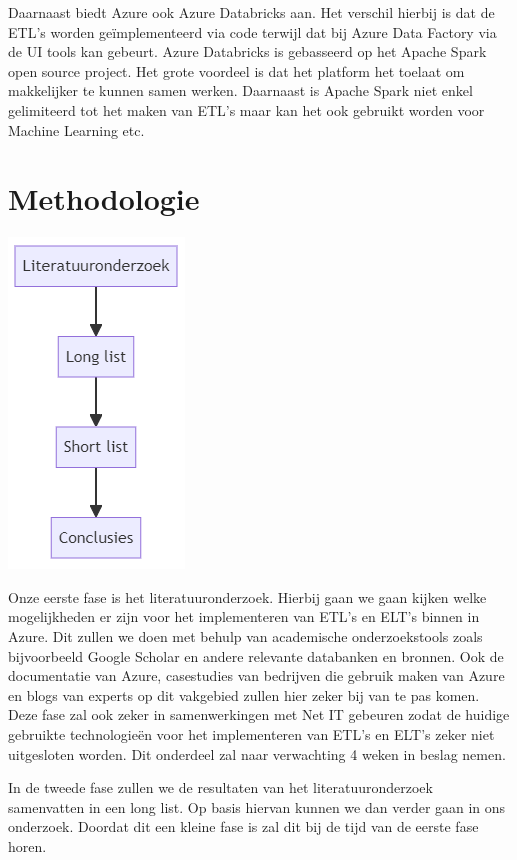 Daarnaast biedt Azure ook Azure Databricks aan. Het verschil hierbij is dat de ETL's worden geïmplementeerd via code terwijl dat bij Azure Data Factory via de UI tools kan gebeurt. Azure Databricks is gebasseerd op het Apache Spark open source project. Het grote voordeel is dat het platform het toelaat om makkelijker te kunnen samen werken. Daarnaast is Apache Spark niet enkel gelimiteerd tot het maken van ETL's maar kan het ook gebruikt worden voor Machine Learning etc.~\autocite{Etaati2019}

\section{Methodologie}%
\label{sec:methodologie}

\begin{center}
    \includegraphics{graphics/methodologie.png}    
\end{center}


Onze eerste fase is het literatuuronderzoek. Hierbij gaan we gaan kijken welke mogelijkheden er zijn voor het implementeren van ETL's en ELT's binnen in Azure. Dit zullen we doen met behulp van academische onderzoekstools zoals bijvoorbeeld Google Scholar en andere relevante databanken en bronnen. Ook de documentatie van Azure, casestudies van bedrijven die gebruik maken van Azure en blogs van experts op dit vakgebied zullen hier zeker bij van te pas komen. Deze fase zal ook zeker in samenwerkingen met Net IT gebeuren zodat de huidige gebruikte technologieën voor het implementeren van ETL's en ELT's zeker niet uitgesloten worden. Dit onderdeel zal naar verwachting 4 weken in beslag nemen. 

In de tweede fase zullen we de resultaten van het literatuuronderzoek samenvatten in een long list. Op basis hiervan kunnen we dan verder gaan in ons onderzoek. Doordat dit een kleine fase is zal dit bij de tijd van de eerste fase horen.

